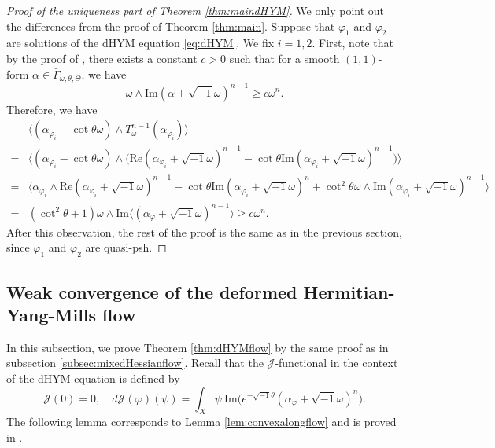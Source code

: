\documentclass{amsart}
\numberwithin{equation}{section}
\theoremstyle{plain}
\theoremstyle{definition}
\theoremstyle{remark}
\begin{document}
\begin{proof}[Proof of the uniqueness part of Theorem \ref{thm:maindHYM}]
    We only point out the differences from the proof of Theorem \ref{thm:main}. Suppose that $\varphi_1$ and $\varphi_2$ are solutions of the dHYM equation \eqref{eq:dHYM}. We fix $i=1,2$.
    First, note that by the proof of \cite[Lemma 5.6 (1)]{GChen}, there exists a constant $c>0$ such that for a smooth $(1,1)$-form $\alpha\in\bar{\Gamma}_{\omega,\theta,\Theta}$, we have
    $$\omega\wedge\mathrm{Im}(\alpha+\sqrt{-1}\omega)^{n-1}\ge c\omega^n.$$
    Therefore, we have
    \begin{align*}
        &\big\langle(\alpha_{\varphi_i}-\cot\theta\omega)\wedge T^{n-1}_\omega(\alpha_{\varphi_i})\big\rangle\\
        =&\big\langle(\alpha_{\varphi_i}-\cot\theta\omega)\wedge \big(\mathrm{Re}(\alpha_{\varphi_i}+\sqrt{-1}\omega)^{n-1}-\cot\theta\mathrm{Im}(\alpha_{\varphi_i}+\sqrt{-1}\omega)^{n-1}\big)\big\rangle\\
        =&\big\langle\alpha_{\varphi_i}\wedge\mathrm{Re}(\alpha_{\varphi_i}+\sqrt{-1}\omega)^{n-1}-\cot\theta\mathrm{Im}(\alpha_{\varphi_i}+\sqrt{-1}\omega)^n+\cot^2\theta\omega\wedge\mathrm{Im}(\alpha_{\varphi_i}+\sqrt{-1}\omega)^{n-1}\big\rangle\\
        =&(\cot^2\theta+1)\omega\wedge\mathrm{Im}\big\langle(\alpha_\varphi+\sqrt{-1}\omega)^{n-1}\big\rangle\ge c\omega^n.
    \end{align*}
    After this observation, the rest of the proof is the same as in the previous section, since $\varphi_1$ and $\varphi_2$ are quasi-psh.
\end{proof}

\subsection{Weak convergence of the deformed Hermitian-Yang-Mills flow}

In this subsection, we prove Theorem \ref{thm:dHYMflow} by the same proof as in subsection \ref{subsec:mixedHessianflow}. Recall that the $\mathcal{J}$-functional in the context of the dHYM equation is defined by
\begin{equation*}
    \mathcal{J}(0)=0,\quad d\mathcal{J}(\varphi)(\psi)=\int_X\psi\ \mathrm{Im}\Big(e^{-\sqrt{-1}\theta}(\alpha_\varphi+\sqrt{-1}\omega)^n\Big).
\end{equation*}
The following lemma corresponds to Lemma \ref{lem:convexalongflow} and is proved in \cite[Lemma 3.1]{Mur}. 
\end{document}
